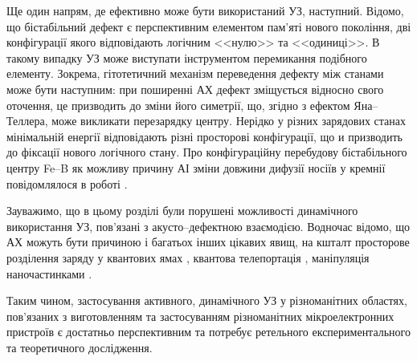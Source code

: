 Ще один напрям, де ефективно може бути використаний УЗ, наступний.
Відомо, що бістабільний дефект є перспективним елементом пам'яті нового покоління,
дві конфігурації якого відповідають логічним <<нулю>> та <<одиниці>>.
В такому випадку УЗ може виступати інструментом перемикання подібного елементу.
Зокрема, гітотетичний механізм переведення дефекту між станами може бути наступним:
при поширенні АХ дефект зміщується відносно свого оточення, це призводить до зміни його симетрії, що, згідно з ефектом Яна--Теллера, може викликати перезарядку центру.
Нерідко у різних зарядових станах мінімальній енергії відповідають різні просторові конфігурації, що и призводить до фіксації нового логічного стану.
Про конфігураційну перебудову бістабільного центру Fe--B як можливу причину АІ зміни довжини дифузії носіїв у кремнії повідомлялося в роботі \cite{OlikhFTT}.

Зауважимо, що в цьому розділі були порушені можливості динамічного використання УЗ, пов'язані з акусто--дефектною взаємодією.
Водночас відомо, що АХ можуть бути причиною і багатьох інших цікавих явищ, на кшталт просторове розділення заряду у квантових ямах \cite{Kuryliuk2009}, квантова телепортація \cite{Buscemi}, маніпуляція наночастинками \cite{Cuberes,Olikh:SPQEO2010}.

Таким чином, застосування активного, динамічного УЗ у різноманітних областях, пов'язаних з виготовленням та застосуванням різноманітних мікроелектронних пристроїв є достатньо перспективним та потребує ретельного експериментального та теоретичного дослідження.



